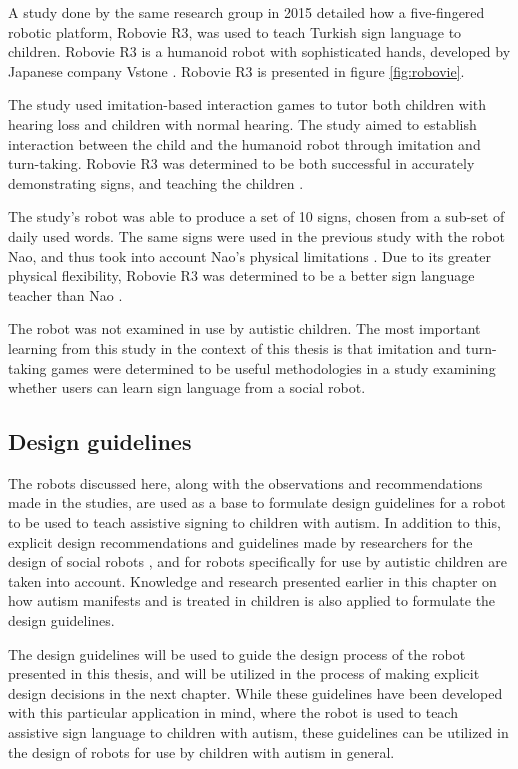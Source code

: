 A study done by the same research group in 2015 detailed how a five-fingered robotic platform, Robovie R3, was used to teach Turkish sign language to children. Robovie R3 is a humanoid robot with sophisticated hands, developed by Japanese company Vstone \cite{Vstone}. Robovie R3 is presented in figure \ref{fig:robovie}.

The study used imitation-based interaction games to tutor both children with hearing loss and children with normal hearing. The study aimed to establish interaction between the child and the humanoid robot through imitation and turn-taking. Robovie R3 was determined to be both successful in accurately demonstrating signs, and teaching the children \cite{uluer2015new}.

The study's robot was able to produce a set of 10 signs, chosen from a sub-set of daily used words. The same signs were used in the previous study with the robot Nao, and thus took into account Nao's physical limitations \cite{taleofarobot}. Due to its greater physical flexibility, Robovie R3 was determined to be a better sign language teacher than Nao \cite{uluer2015new}.

The robot was not examined in use by autistic children. The most important learning from this study in the context of this thesis is that imitation and turn-taking games were determined to be useful methodologies in a study examining whether users can learn sign language from a social robot.


\subsection{Design guidelines}

The robots discussed here, along with the observations and recommendations made in the studies, are used as a base to formulate design guidelines for a robot to be used to teach assistive signing to children with autism. In addition to this, explicit design recommendations and guidelines made by researchers for the design of social robots \cite{bartneck2004design}, and for robots specifically for use by autistic children \cite{designSpaces, giullian2010detailed, michaud2003characteristics, robins2007eliciting} are taken into account. Knowledge and research presented earlier in this chapter on how autism manifests and is treated in children is also applied to formulate the design guidelines.

The design guidelines will be used to guide the design process of the robot presented in this thesis, and will be utilized in the process of making explicit design decisions in the next chapter. While these guidelines have been developed with this particular application in mind, where the robot is used to teach assistive sign language to children with autism, these guidelines can be utilized in the design of robots for use by children with autism in general.

